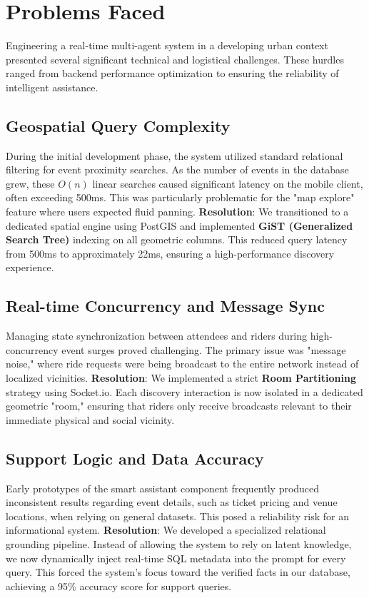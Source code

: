 \chapter{Problems Faced}
Engineering a real-time multi-agent system in a developing urban context presented several significant technical and logistical challenges. These hurdles ranged from backend performance optimization to ensuring the reliability of intelligent assistance.

\section{Geospatial Query Complexity}
During the initial development phase, the system utilized standard relational filtering for event proximity searches. As the number of events in the database grew, these $O(n)$ linear searches caused significant latency on the mobile client, often exceeding 500ms. This was particularly problematic for the "map explore" feature where users expected fluid panning.
\textbf{Resolution}: We transitioned to a dedicated spatial engine using PostGIS and implemented \textbf{GiST (Generalized Search Tree)} indexing on all geometric columns. This reduced query latency from 500ms to approximately 22ms, ensuring a high-performance discovery experience.

\section{Real-time Concurrency and Message Sync}
Managing state synchronization between attendees and riders during high-concurrency event surges proved challenging. The primary issue was "message noise," where ride requests were being broadcast to the entire network instead of localized vicinities.
\textbf{Resolution}: We implemented a strict \textbf{Room Partitioning} strategy using Socket.io. Each discovery interaction is now isolated in a dedicated geometric "room," ensuring that riders only receive broadcasts relevant to their immediate physical and social vicinity.

\section{Support Logic and Data Accuracy}
Early prototypes of the smart assistant component frequently produced inconsistent results regarding event details, such as ticket pricing and venue locations, when relying on general datasets. This posed a reliability risk for an informational system.
\textbf{Resolution}: We developed a specialized relational grounding pipeline. Instead of allowing the system to rely on latent knowledge, we now dynamically inject real-time SQL metadata into the prompt for every query. This forced the system's focus toward the verified facts in our database, achieving a 95\% accuracy score for support queries.

